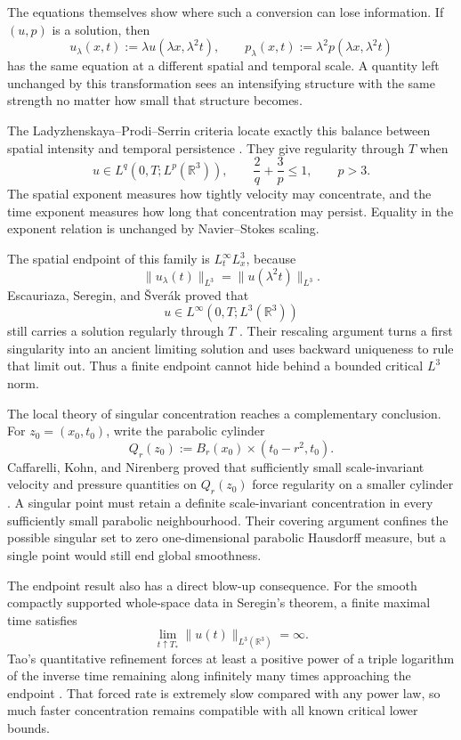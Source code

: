 The equations themselves show where such a conversion can lose information.
If \((u,p)\) is a solution, then
\[
  u_\lambda(x,t)
  :=
  \lambda u(\lambda x,\lambda^2t),
  \qquad
  p_\lambda(x,t)
  :=
  \lambda^2p(\lambda x,\lambda^2t)
\]
has the same equation at a different spatial and temporal scale.
A quantity left unchanged by this transformation sees an intensifying structure with the same strength no matter how small that structure becomes.

The Ladyzhenskaya--Prodi--Serrin criteria locate exactly this balance between spatial intensity and temporal persistence \parencite{Prodi1959,Serrin1962,Serrin1963,Ladyzhenskaya1967}.
They give regularity through \(T\) when
\[
  u\in L^q(0,T;L^p(\mathbb R^3)),
  \qquad
  \frac{2}{q}+\frac{3}{p}\leq1,
  \qquad
  p>3.
\]
The spatial exponent measures how tightly velocity may concentrate, and the time exponent measures how long that concentration may persist.
Equality in the exponent relation is unchanged by Navier--Stokes scaling.

The spatial endpoint of this family is \(L^\infty_tL^3_x\), because
\[
  \lVert u_\lambda(t)\rVert_{L^3}
  =
  \lVert u(\lambda^2t)\rVert_{L^3}.
\]
Escauriaza, Seregin, and \v{S}ver{\'a}k proved that
\[
  u\in L^\infty(0,T;L^3(\mathbb R^3))
\]
still carries a solution regularly through \(T\) \parencite{EscauriazaSereginSverak2003}.
Their rescaling argument turns a first singularity into an ancient limiting solution and uses backward uniqueness to rule that limit out.
Thus a finite endpoint cannot hide behind a bounded critical \(L^3\) norm.

The local theory of singular concentration reaches a complementary conclusion.
For \(z_0=(x_0,t_0)\), write the parabolic cylinder
\[
  Q_r(z_0)
  :=
  B_r(x_0)\times(t_0-r^2,t_0).
\]
Caffarelli, Kohn, and Nirenberg proved that sufficiently small scale-invariant velocity and pressure quantities on \(Q_r(z_0)\) force regularity on a smaller cylinder \parencite{CaffarelliKohnNirenberg1982}.
A singular point must retain a definite scale-invariant concentration in every sufficiently small parabolic neighbourhood.
Their covering argument confines the possible singular set to zero one-dimensional parabolic Hausdorff measure, but a single point would still end global smoothness.

The endpoint result also has a direct blow-up consequence.
For the smooth compactly supported whole-space data in Seregin's theorem, a finite maximal time satisfies \parencite{Seregin2012}
\[
  \lim_{t\uparrow T_*}
  \lVert u(t)\rVert_{L^3(\mathbb R^3)}
  =\infty.
\]
Tao's quantitative refinement forces at least a positive power of a triple logarithm of the inverse time remaining along infinitely many times approaching the endpoint \parencite{Tao2021Quantitative}.
That forced rate is extremely slow compared with any power law, so much faster concentration remains compatible with all known critical lower bounds.


